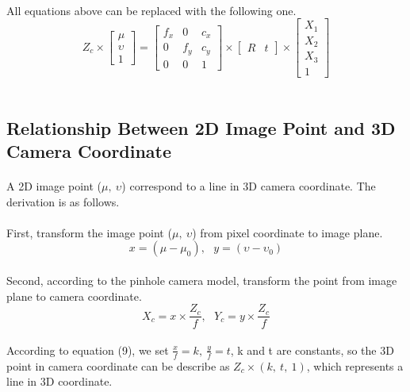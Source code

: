 \documentclass{article}
\begin{document}
\paragraph{}All equations above can be replaced with the following one.
\begin{equation}
Z_c \times \left[\begin{array}{c}
\mu\\
\upsilon\\
1
\end{array}
\right] = \left[\begin{array}{ccc}
f_x & 0 & c_x\\
0 & f_y & c_y\\
0 & 0 & 1
\end{array}
\right] \times \left[\begin{array}{cc}R & t \end{array}\right] \times \left[\begin{array}{c}
X_1\\
X_2\\
X_3\\
1
\end{array}
\right]
\end{equation}
\\
\subsection{Relationship Between 2D Image Point and 3D Camera Coordinate}
\paragraph{}A 2D image point ($\mu,\ \upsilon$) correspond to a line in 3D camera coordinate. The derivation is as follows.
\paragraph{}\noindent First, transform the image point ($\mu,\ \upsilon$) from pixel coordinate to image plane.
\\
\begin{equation}
x = (\mu - \mu_0),\ \ \ y = (\upsilon - \upsilon_0)
\end{equation}
\\
Second, according to the pinhole camera model, transform the point from image plane to camera coordinate.
\\
\begin{equation}
X_c = x \times \frac{Z_c}{f},\ \ \ Y_c = y \times \frac{Z_c}{f}
\end{equation}
\\
According to equation (9), we set $\frac{x}{f}=k,\ \frac{y}{f}=t$, k and t are constants, so the 3D point in camera coordinate can be describe as $Z_c \times (k,\ t,\ 1)$, which represents a line in 3D coordinate.
\end{document}
